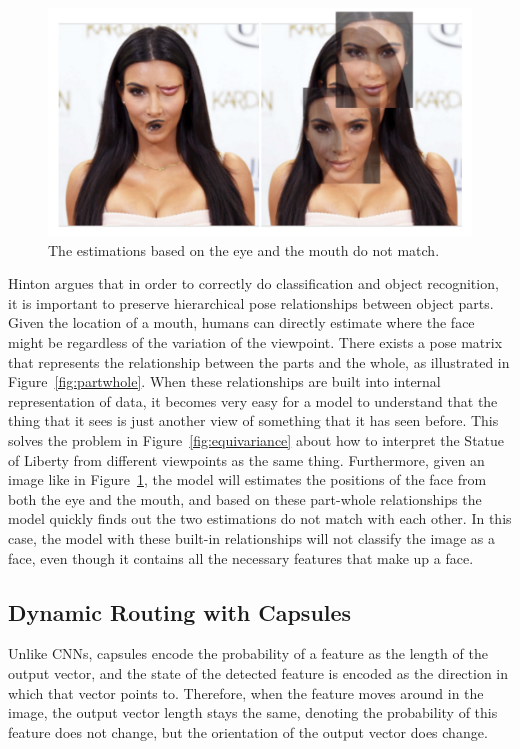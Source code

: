 \documentclass{article}
\begin{document}

\begin{figure}[!htb]
	\centering\includegraphics[width=.8\textwidth]{fig/agreement}
	\caption{The estimations based on the eye and the mouth do not match.\protect\footnotemark }\label{fig:agreement}
\end{figure}


Hinton argues that in order to correctly do classification and object recognition, it is important to preserve hierarchical pose relationships between object parts. Given the location of a mouth, humans can directly estimate where the face might be regardless of the variation of the viewpoint. There exists a pose matrix that represents the relationship between the parts and the whole, as illustrated in Figure~\ref{fig:partwhole}. When these relationships are built into internal representation of data, it becomes very easy for a model to understand that the thing that it sees is just another view of something that it has seen before. This solves the problem in Figure~\ref{fig:equivariance} about how to interpret the Statue of Liberty from different viewpoints as the same thing. Furthermore, given an image like in Figure~\ref{fig:agreement}, the model will estimates the positions of the face from both the eye and the mouth, and based on these part-whole relationships the model quickly finds out the two estimations do not match with each other. In this case, the model with these built-in relationships will not classify the image as a face, even though it contains all the necessary features that make up a face.  

\subsection{Dynamic Routing with Capsules}
Unlike CNNs, capsules encode the probability of a feature as the length of the output vector, and the state of the detected feature is encoded as the direction in which that vector points to. Therefore, when the feature moves around in the image, the output vector length stays the same, denoting the probability of this feature does not change, but the orientation of the output vector does change. 
\end{document}
